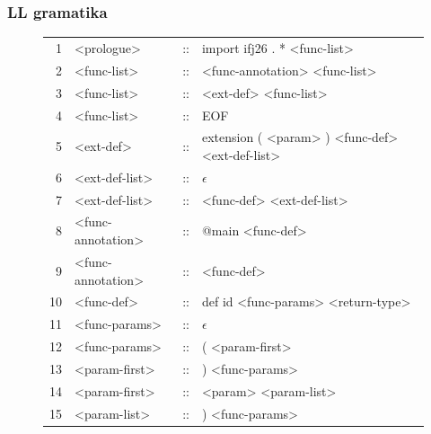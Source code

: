 \documentclass[11pt]{article}
\begin{document}
{{	  \subsubsection{LL gramatika} {
		  \begin{figure}[H]
			  \centering
			  \small
			  \ttfamily\begin{tabularx}{\textwidth}{r l c >{\raggedright\arraybackslash}X}
				  1  & <prologue>        & :: & import ifj26 . * <func-list>                                        \\
				  2  & <func-list>       & :: & <func-annotation> <func-list>                                       \\
				  3  & <func-list>       & :: & <ext-def> <func-list>                                               \\
				  4  & <func-list>       & :: & EOF                                                                 \\
				  5  & <ext-def>         & :: & extension ( <param> ) <func-def> <ext-def-list>                     \\
				  6  & <ext-def-list>    & :: & \(\epsilon\)                                                        \\
				  7  & <ext-def-list>    & :: & <func-def> <ext-def-list>                                           \\
				  8  & <func-annotation> & :: & @main <func-def>                                                    \\
				  9  & <func-annotation> & :: & <func-def>                                                          \\
				  10 & <func-def>        & :: & def id <func-params> <return-type>                                  \\
				  11 & <func-params>     & :: & \(\epsilon\)                                                        \\
				  12 & <func-params>     & :: & ( <param-first>                                                     \\
				  13 & <param-first>     & :: & ) <func-params>                                                     \\
				  14 & <param-first>     & :: & <param> <param-list>                                                \\
				  15 & <param-list>      & :: & ) <func-params>                                                     \\

\end{tabularx}
\end{figure}}}}
\end{document}
